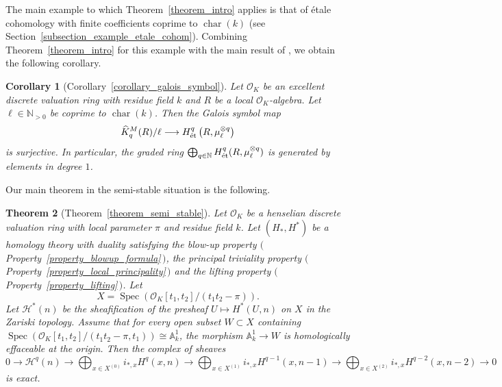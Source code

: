 \documentclass[11pt]{amsart}
\numberwithin{equation}{section}
\newtheorem{theorem}{Theorem}[section]
\newtheorem{Key lemma}[theorem]{Key lemma}
\newtheorem{corollary}[theorem]{Corollary}
\theoremstyle{definition}
\theoremstyle{remark}
\newcommand{\bb}{\mathbb}
\newcommand{\roi}{\mathcal{O}}
\newcommand{\sub}[1]{{\mbox{\rm \scriptsize #1}}}
\newcommand{\To}{\longrightarrow}
\newcommand{\cal}{\mathcal}
\renewcommand{\hat}{\widehat}
\DeclareMathOperator{\Char}{char}
\DeclareMathOperator{\Spec}{Spec}
\begin{document}
The main example to which Theorem~\ref{theorem_intro} applies is that of \'etale cohomology with finite coefficients coprime to $\Char(k)$ (see Section~\ref{subsection_example_etale_cohom}). 
Combining Theorem~\ref{theorem_intro} for this example with the main result of \cite{Lu20}, we obtain the following corollary.

\begin{corollary}[Corollary~\ref{corollary_galois_symbol}]
Let $\cal O_K$ be an excellent discrete valuation ring with residue field $k$ and $R$ be a local $\cal O_K$-algebra. Let $\ell\in \bb N_{>0}$ be coprime to $\Char(k)$. Then the Galois symbol map
$$
\hat{K}^M_q(R)/\ell\longrightarrow H^q_\sub{\'et}\left(R,\mu_\ell^{\otimes q}\right)
$$
is surjective. In particular, the graded ring $\bigoplus_{q\in \bb N}H^q_\sub{\'et}(R,\mu_\ell^{\otimes q} )$ is generated by elements in degree $1$.
\end{corollary}

Our main theorem in the semi-stable situation is the following.

\begin{theorem}[Theorem~\ref{theorem_semi_stable}]\label{theorem_semi_stable_intro}
Let $\cal O_K$ be a henselian discrete valuation ring with local parameter $\pi$ and residue field $k$. Let $(H_*,H^*)$ be a homology theory with duality satisfying the blow-up property $($Property~\ref{property_blowup_formula}\,$)$, the principal triviality property $($Property~\ref{property_local_principality}\,$)$ and the lifting property $($Property~\ref{property_lifting}\,$)$. 
Let 
$$
X=\Spec(\roi_K[t_1,t_2]/(t_1^{} t_{2}^{}-\pi)).
$$
Let $\cal H^*(n)$ be the sheafification of the presheaf $U\mapsto H^*(U,n)$ on $X$ in the Zariski topology. Assume that for every open subset $W\subset X$ containing $\Spec(\roi_K[t_1,t_2]/(t_1^{}t_{2}^{}-\pi,t_1))\cong \bb A^1_k$, the morphism $ \bb A^1_k\to W$ is homologically effaceable at the origin. Then the complex of sheaves
\begin{equation*}
0\To \cal H^q(n) \To \bigoplus_{x\in X^{(0)}}i_{*,x}H^{q}(x,n)\To \bigoplus_{x\in X^{(1)}}i_{*,x}H^{q-1}(x,n-1)\To \bigoplus_{x\in X^{(2)}}i_{*,x}H^{q-2}(x,n-2)\To 0 
\end{equation*}
is exact.
\end{theorem}
\end{document}
